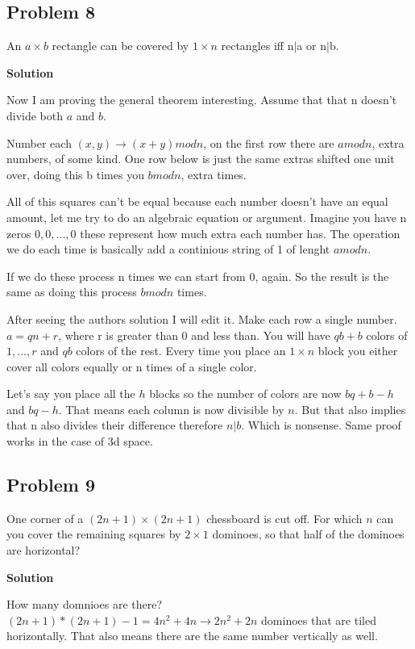\documentclass{article}
\begin{document}
\subsection{Problem 8}

An $a \times b$ rectangle can be covered by $1 \times n$ rectangles iff n$\vert$a or n$\vert$b.

\textbf{Solution}

Now I am proving the general theorem interesting. Assume that that n doesn't divide both 
$a$ and $b$.

Number each $(x,y) \rightarrow (x+y) mod n$, on the first row there are $a mod n$, extra numbers, of some kind.
One row below is just the same extras shifted one unit over, doing this b times you $b mod n$, extra times.

All of this squares can't be equal because each number doesn't have an equal amount, let me try to do an 
algebraic equation or argument. Imagine you have n zeros $0,0,...,0$ these represent how much extra 
each number has. The operation we do each time is basically add a continious string of 1 of lenght $a mod n$.

If we do these process n times we can start from 0, again. So the result is the same as doing this process $b mod n$ times.

After seeing the authors solution I will edit it. Make each row a single number. 
$a=qn+r$, where r is greater than 0 and less than. You will have $qb+b$ colors of $1,...,r$ and $qb$ colors of the 
rest. Every time you place an $1\times n$ block you either cover all colors equally or n times of a single color.

Let's say you place all the $h$ blocks so the number of colors are now $bq+b-h$ and $bq-h$. 
That means each column is now divisible by $n$. But that also implies that n also divides their difference 
therefore $n\vert b$. Which is nonsense. Same proof works in the case of 3d space.

\subsection{Problem 9}

One corner of a $(2n + 1) \times (2n + 1)$ chessboard is cut off. For which $n$ can you
cover the remaining squares by $2 \times 1$ dominoes, so that half of the dominoes are
horizontal?

\textbf{Solution}

How many domnioes are there? $(2n+1)*(2n+1)-1=4n^2+4n \rightarrow 2n^2+2n$ dominoes 
that are tiled horizontally. That also means there are the same number vertically as well.
\end{document}

